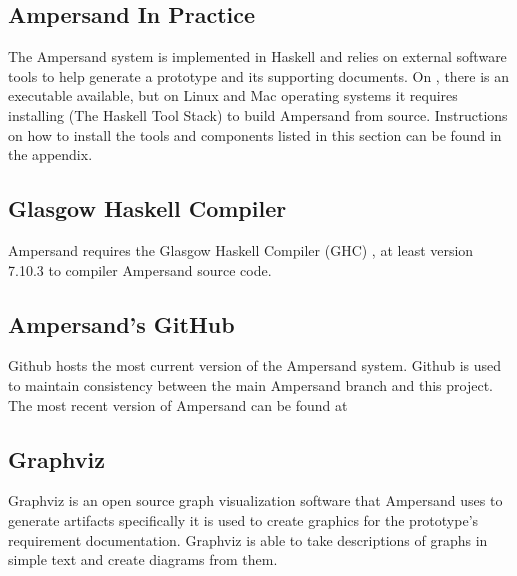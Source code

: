 \documentclass[journal,12pt,onecolumn,draftclsnofoot]{report}
\let\Oldsubsection\subsection
\renewcommand{\subsection}{\FloatBarrier\Oldsubsection}
\begin{document}


\subsection{Ampersand In Practice}

The \gls{Ampersand} system is implemented in Haskell and relies on external software 
tools to help generate a \gls{prototype} and its supporting documents.
On , 
there is an executable available, but on Linux and Mac operating systems it 
requires installing  (The Haskell Tool Stack)
to build \gls{Ampersand} from source. 
Instructions on how to install the tools and components listed in this section 
can be found in the appendix.

\subsection*{Glasgow Haskell Compiler}

Ampersand requires the Glasgow Haskell Compiler (GHC) \cite{ghc}, at least version 
7.10.3 to compiler \gls{Ampersand} source code. 

\subsection*{Ampersand's GitHub}\label{Github}

Github hosts the most current version of the \gls{Ampersand} system. Github is used 
to maintain consistency between the main \gls{Ampersand} branch and this project. The 
most recent version of \gls{Ampersand} can be found at 
\cite{ampersandGit}

\subsection*{Graphviz}

Graphviz \cite{graphviz}
 is an open source graph visualization software that \gls{Ampersand} uses to generate 
 artifacts specifically it is used to create graphics for the prototype's 
 requirement documentation. Graphviz is able to take descriptions of graphs in 
 simple text and create diagrams from them. 
\end{document}
